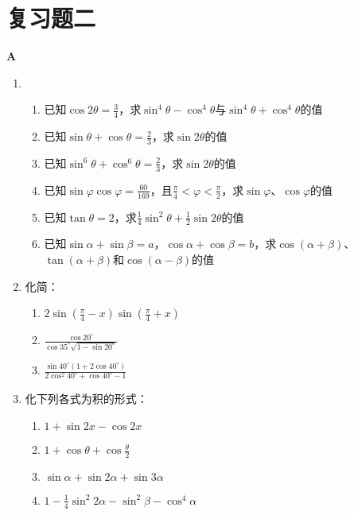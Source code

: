 \section*{复习题二}
\begin{center}
    \bfseries A
\end{center}

\begin{enumerate}
    \item \begin{enumerate}[(1)]
        \item 已知$\cos2\theta=\frac{3}{4}$，求$\sin^4\theta-\cos^4\theta$与$\sin^4\theta+\cos^4\theta$的值
        \item 已知$\sin\theta+\cos\theta=\frac{2}{3}$，求$\sin2\theta$的值
        \item 已知$\sin^6\theta+\cos^6\theta=\frac{2}{3}$，求$\sin2\theta$的值
        \item 已知$\sin\varphi\cos\varphi=\frac{60}{169}$，且$\frac{\pi}{4}<\varphi<\frac{\pi}{2}$，求$\sin\varphi$、$\cos\varphi$的值
        \item 已知$\tan\theta=2$，求$\frac{1}{4}\sin^2\theta+\frac{1}{2}\sin2\theta$的值
        \item 已知$\sin\alpha+\sin\beta=a$，$\cos\alpha+\cos\beta=b$，求$\cos(\alpha+\beta)$、$\tan(\alpha+\beta)$和$\cos(\alpha-\beta)$的值
    \end{enumerate}

\item 化简：
\begin{multicols}{2}
\begin{enumerate}[(1)]
    \item $2\sin\left(\frac{\pi}{4}-x\right)\sin\left(\frac{\pi}{4}+x\right)$
    \item $\frac{\cos20^{\circ}}{\cos35^{\circ}\sqrt{1-\sin20^{\circ}}}$
    \item $\frac{\sin40^{\circ}(1+2\cos 40^{\circ})}{2\cos^2 40^{\circ}+\cos40^{\circ}-1}$
\end{enumerate}
\end{multicols}

\item 化下列各式为积的形式：
\begin{multicols}{2}
\begin{enumerate}[(1)]
    \item $1+\sin2x-\cos2x$
    \item $1+\cos\theta+\cos\frac{\theta}{2}$
    \item $\sin\alpha+\sin2\alpha+\sin3\alpha$
    \item $1-\frac{1}{4}\sin^2 2\alpha-\sin^2\beta-\cos^4\alpha$
\end{enumerate}
\end{multicols}


\end{enumerate}
